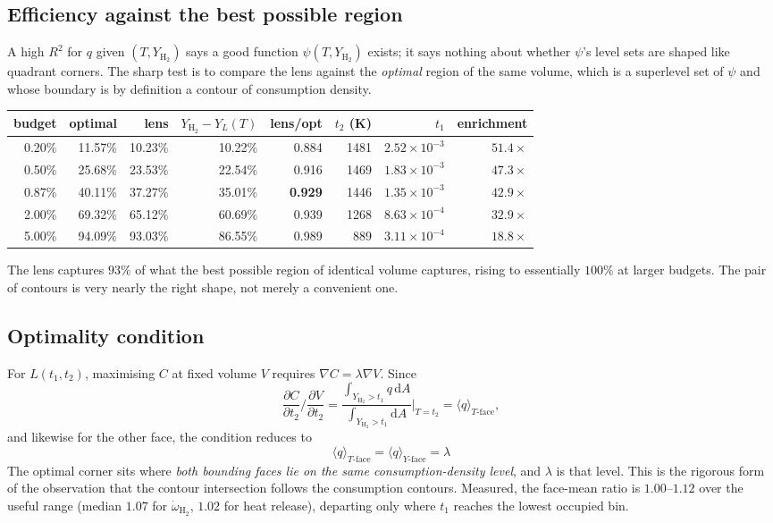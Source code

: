 \documentclass[11pt]{article}
\newcommand{\YH}{Y_{\mathrm{H_2}}}
\newcommand{\grad}{\nabla}
\newcommand{\pd}[2]{\frac{\partial #1}{\partial #2}}
\begin{document}
\subsection{Efficiency against the best possible region}

A high $R^2$ for $q$ given $(T,\YH)$ says a good function $\psi(T,\YH)$
exists; it says nothing about whether $\psi$'s level sets are shaped like
quadrant corners. The sharp test is to compare the lens against the
\emph{optimal} region of the same volume, which is a superlevel set of $\psi$
and whose boundary is by definition a contour of consumption density.

\begin{center}
\begin{tabular}{rrrrrrrr}
\toprule
budget & optimal & lens & $\YH - Y_L(T)$ & lens/opt & $t_2$ (K) & $t_1$ & enrichment \\
\midrule
0.20\% & 11.57\% & 10.23\% & 10.22\% & 0.884 & 1481 & $2.52\times10^{-3}$ & $51.4\times$ \\
0.50\% & 25.68\% & 23.53\% & 22.54\% & 0.916 & 1469 & $1.83\times10^{-3}$ & $47.3\times$ \\
0.87\% & 40.11\% & 37.27\% & 35.01\% & \textbf{0.929} & 1446 & $1.35\times10^{-3}$ & $42.9\times$ \\
2.00\% & 69.32\% & 65.12\% & 60.69\% & 0.939 & 1268 & $8.63\times10^{-4}$ & $32.9\times$ \\
5.00\% & 94.09\% & 93.03\% & 86.55\% & 0.989 & \phantom{0}889 & $3.11\times10^{-4}$ & $18.8\times$ \\
\bottomrule
\end{tabular}
\end{center}

The lens captures $93\%$ of what the best possible region of identical volume
captures, rising to essentially $100\%$ at larger budgets. The pair of
contours is very nearly the right shape, not merely a convenient one.

\subsection{Optimality condition}

For $L(t_1,t_2)$, maximising $C$ at fixed volume $V$ requires $\grad C =
\lambda \grad V$. Since
\begin{equation}
  \pd{C}{t_2} \Big/ \pd{V}{t_2}
    = \frac{\int_{\YH>t_1} q \,\mathrm{d}A}{\int_{\YH>t_1} \mathrm{d}A}
    \Bigg|_{T=t_2}
  = \langle q \rangle_{T\text{-face}},
\end{equation}
and likewise for the other face, the condition reduces to
\begin{equation}
  \boxed{\;\langle q \rangle_{T\text{-face}}
       = \langle q \rangle_{Y\text{-face}} = \lambda\;}
\end{equation}
The optimal corner sits where \emph{both bounding faces lie on the same
consumption-density level}, and $\lambda$ is that level. This is the rigorous
form of the observation that the contour intersection follows the consumption
contours. Measured, the face-mean ratio is $1.00$--$1.12$ over the useful
range (median $1.07$ for $\dot{\omega}_{\mathrm{H_2}}$, $1.02$ for heat
release), departing only where $t_1$ reaches the lowest occupied bin.
\end{document}
